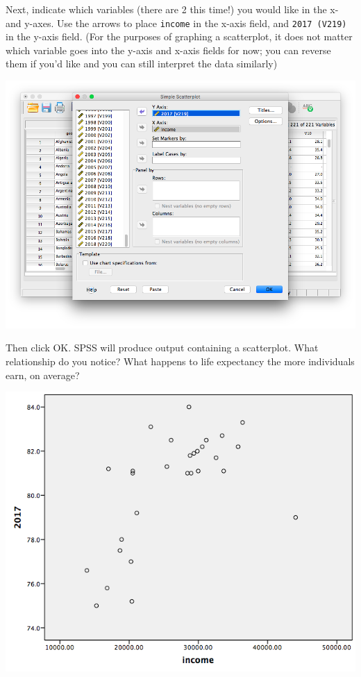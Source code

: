 \documentclass[
]{book}
\begin{document}
Next, indicate which variables (there are 2 this time!) you would like in the x- and y-axes. Use the arrows to place \texttt{income} in the x-axis field, and \texttt{2017\ (V219)} in the y-axis field. (For the purposes of graphing a scatterplot, it does not matter which variable goes into the y-axis and x-axis fields for now; you can reverse them if you'd like and you can still interpret the data similarly)

\includegraphics{img/1.4.23.png}

Then click {OK}.
SPSS will produce output containing a scatterplot. What relationship do you notice? What happens to life expectancy the more individuals earn, on average?

\includegraphics{img/1.4.24.png}
\end{document}
